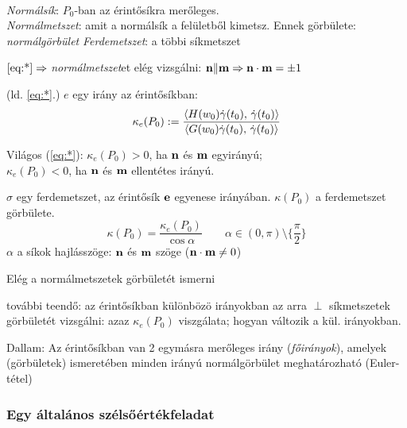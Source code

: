 \begin{de}\ \\
  \emph{Normálsík}: $P_0$-ban az érintősíkra merőleges.\\
  \emph{Normálmetszet}: amit a normálsík a felületből kimetsz. Ennek görbülete: \emph{normálgörbület}
  \emph{Ferdemetszet}: a többi síkmetszet
\end{de}

\begin{megj}
  $\eqref{eq:*}\Rightarrow$ \emph{normálmetszet}et elég vizsgálni: $\mathbf{n}\Vert \mathbf{m}\Rightarrow \mathbf{n} \cdot \mathbf{m} = \pm 1$
\end{megj}


\begin{de} (ld. \ref{eq:*}.) $e$ egy irány az érintősíkban:
  \[ \kappa_e(P_0) := \dfrac{\langle H(w_0)\Dot{\gamma}(t_0),\,\Dot\gamma(t_0)\rangle}{
    \langle G(w_0)\Dot{\gamma}(t_0),\,\Dot\gamma(t_0)\rangle} \]
\end{de}

\begin{megj}
  Világos (\ref{eq:*}): $\kappa_e(P_0) > 0$, ha $\mathbf{n}$ és $\mathbf{m}$ egyirányú;\\
  $\kappa_e(P_0) < 0$, ha $\mathbf{n}$ és $\mathbf{m}$ ellentétes irányú.
\end{megj}

\begin{te}
  $\sigma$ egy ferdemetszet, az érintősík $\mathbf{e}$ egyenese irányában.
  $\kappa (P_0)$ a ferdemetszet görbülete.\\
  \[\kappa(P_0) = \dfrac{\kappa_e(P_0)}{\cos\alpha}\qquad \alpha\in(0,\pi)\setminus\{\dfrac\pi2\}\]
  $\alpha$ a síkok hajlásszöge: $\mathbf{n}$ és $\mathbf{m}$ szöge ($\mathbf{n} \cdot \mathbf{m} \neq 0$)  
\end{te}

\newpage
\begin{Megj}
\item Elég a normálmetszetek görbületét ismerni
\item további teendő: az érintősíkban különbözö irányokban az arra $\perp$ síkmetszetek görbületét vizsgálni:
  azaz $\kappa_e(P_0)$ viszgálata; hogyan változik a kül. irányokban.
\item Dallam: Az érintősíkban van 2 egymásra merőleges irány (\emph{főirányok}), amelyek (görbületek) ismeretében minden
  irányú normálgörbület meghatározható (Euler-tétel)
\end{Megj}


\subsubsection{Egy általános szélsőértékfeladat}

